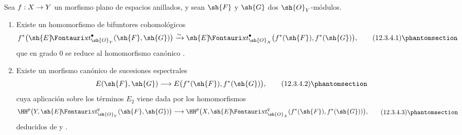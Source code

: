 \documentclass[oneside]{amsart}
\makeatletter
\newcommand{\ega@arrow}[2]{\mathchoice{#1}{#2}{#2}{#2}}
\renewcommand{\to}{\ega@arrow{\longrightarrow}{\rightarrow}}
\newcommand*{\ega@sheafop}[3]{\sh{#1}#2\textup{\kern-2.2pt{\Fontauri\slshape #3}}}
\newcommand*{\shExt}{\ega@sheafop{E}{}{xt}}
\newcommand{\oldpage}[2][]{{\marginnote{\normalfont\textbf{#1}~|~#2}}\ignorespaces}
\let\EGAOriginalLabel\label
\renewcommand{\label}[1]{\phantomsection\EGAOriginalLabel{#1}}
\makeatother
\begin{document}
\oldpage[0\textsubscript{III}]{61}
\begin{proposition}[12.3.4]
\label{0.12.3.4}
Sea $f:X\to Y$ un morfismo \textup{plano} de espacios anillados, y sean
$\sh{F}$ y $\sh{G}$ dos $\sh{O}_Y$-módulos.
\begin{enumerate}
  \item[\rm(i)] Existe un homomorfismo de bifuntores cohomológicos
  \[
    f^*\bigl(\shExt^\bullet_{\sh{O}_Y}(\sh{F},\sh{G})\bigr)
    \xrightarrow{\sim}
    \shExt^\bullet_{\sh{O}_X}
      \bigl(f^*(\sh{F}),f^*(\sh{G})\bigr),
    \tag{12.3.4.1}
    \label{0.12.3.4.1}
  \]
  que en grado $0$ se reduce al homomorfismo canónico
  .

  \item[\rm(ii)] Existe un morfismo canónico de sucesiones espectrales
  \[
    E(\sh{F},\sh{G})
    \longrightarrow E\bigl(f^*(\sh{F}),f^*(\sh{G})\bigr),
    \tag{12.3.4.2}
    \label{0.12.3.4.2}
  \]
  cuya aplicación sobre los términos $E_2$ viene dada por los homomorfismos
  \[
    \begin{aligned}
    \HH^p\bigl(Y,\shExt^q_{\sh{O}_Y}(\sh{F},\sh{G})\bigr)
    \longrightarrow
    \HH^p\bigl(X,\shExt^q_{\sh{O}_X}
      (f^*(\sh{F}),f^*(\sh{G}))\bigr),
    \end{aligned}
    \tag{12.3.4.3}
    \label{0.12.3.4.3}
  \]
  deducidos de  y .
\end{enumerate}
\end{proposition}
\end{document}
